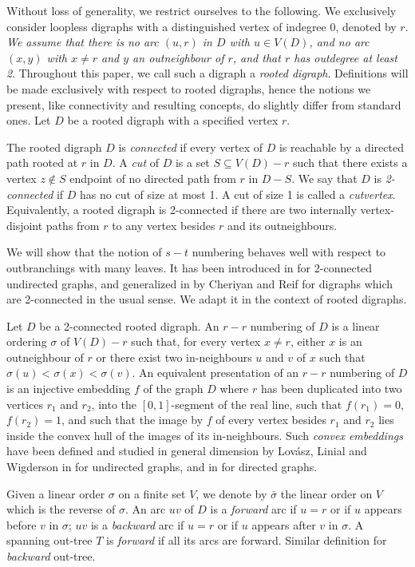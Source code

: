 \documentclass{article}
\begin{document}
Without loss of generality, we restrict ourselves to the following. We exclusively consider loopless digraphs with a distinguished vertex of indegree 0, denoted by $r$. \emph{We assume that there is no arc $(u,r)$ in $D$ with $u\in V(D)$, and no arc $(x,y)$ with $x\neq r$ and $y$ an outneighbour of $r$, and that $r$ has outdegree at least 2}. Throughout this paper, we call such a digraph a \emph{rooted digraph}. Definitions will be made exclusively with respect to rooted digraphs, hence the notions we present, like connectivity and resulting concepts, do slightly differ from standard ones.
Let $D$ be a rooted digraph with a specified vertex $r$. 

The rooted digraph $D$ is \emph{connected} if every vertex of $D$ is reachable by a directed path rooted at $r$ in $D$. A \emph{cut} of $D$ is a set $S\subseteq V(D)-r$ such that there exists a vertex $z\notin S$ endpoint of no directed path from $r$ in $D-S$. We say that $D$ is \emph{2-connected} if $D$ has no cut of size at most 1. A cut of size 1 is called a \emph{cutvertex}. Equivalently, a rooted digraph is 2-connected if there are two internally vertex-disjoint paths from $r$ to any vertex besides $r$ and its outneighbours.

We will show that the notion of $s-t$ numbering behaves well with respect to outbranchings with many leaves. It has been introduced in \cite{stnum} for 2-connected undirected graphs, and generalized in \cite{stnumdir} by Cheriyan and Reif for digraphs which are 2-connected in the usual sense. We adapt it in the context of rooted digraphs.

Let $D$ be a 2-connected rooted digraph. An $r-r$ numbering of $D$ is a linear ordering $\sigma$ of $V(D)-r$ such that, for every vertex $x\neq r$, either $x$ is an outneighbour of $r$ 
or there exist two in-neighbours $u$ and $v$ of $x$ such that $\sigma(u)<\sigma(x)<\sigma(v)$. An equivalent presentation of an $r-r$ numbering of $D$ is an injective embedding $f$ of the graph $D$ where $r$ has been duplicated into two vertices $r_1$ and $r_2$, into the $[0,1]$-segment of the real line, such that $f(r_1)=0$, $f(r_2)=1$, and such that the image by $f$ of every vertex besides $r_1$ and $r_2$ lies inside the convex hull of the images of its in-neighbours. Such \emph{convex embeddings} have been defined and studied in general dimension by Lov\'asz, Linial and Wigderson in \cite{LLWemb} for undirected graphs, and in \cite{stnumdir} for directed graphs.

Given a linear order $\sigma$ on a finite set $V$, we denote by $\bar{\sigma}$ the linear order on $V$ which is the reverse of $\sigma$. An arc $uv$ of $D$ is a \emph{forward} arc
if $u=r$ or if $u$ appears before $v$ in $\sigma$; $uv$ is a \emph{backward} arc if $u=r$ or if $u$ appears after $v$ in $\sigma$. A spanning out-tree $T$ is \emph{forward} if all its arcs are forward. Similar
definition for \emph{backward} out-tree.
\end{document}
